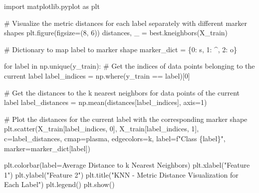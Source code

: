 \documentclass[
  letterpaper,
  DIV=11,
  numbers=noendperiod]{scrreprt}
\newenvironment{Shaded}{\begin{snugshade}}{\end{snugshade}}
\newcommand{\CommentTok}[1]{\textcolor[rgb]{0.37,0.37,0.37}{#1}}
\newcommand{\ControlFlowTok}[1]{\textcolor[rgb]{0.00,0.23,0.31}{#1}}
\newcommand{\DecValTok}[1]{\textcolor[rgb]{0.68,0.00,0.00}{#1}}
\newcommand{\ImportTok}[1]{\textcolor[rgb]{0.00,0.46,0.62}{#1}}
\newcommand{\KeywordTok}[1]{\textcolor[rgb]{0.00,0.23,0.31}{#1}}
\newcommand{\NormalTok}[1]{\textcolor[rgb]{0.00,0.23,0.31}{#1}}
\newcommand{\OperatorTok}[1]{\textcolor[rgb]{0.37,0.37,0.37}{#1}}
\newcommand{\SpecialCharTok}[1]{\textcolor[rgb]{0.37,0.37,0.37}{#1}}
\newcommand{\SpecialStringTok}[1]{\textcolor[rgb]{0.13,0.47,0.30}{#1}}
\newcommand{\StringTok}[1]{\textcolor[rgb]{0.13,0.47,0.30}{#1}}
\begin{document}
\begin{Shaded}
\begin{Highlighting}[]
\ImportTok{import}\NormalTok{ matplotlib.pyplot }\ImportTok{as}\NormalTok{ plt}

\CommentTok{\# Visualize the metric distances for each label separately with different marker shapes}
\NormalTok{plt.figure(figsize}\OperatorTok{=}\NormalTok{(}\DecValTok{8}\NormalTok{, }\DecValTok{6}\NormalTok{))}
\NormalTok{distances, \_ }\OperatorTok{=}\NormalTok{ best.kneighbors(X\_train)}

\CommentTok{\# Dictionary to map label to marker shape}
\NormalTok{marker\_dict }\OperatorTok{=}\NormalTok{ \{}\DecValTok{0}\NormalTok{: }\StringTok{\textquotesingle{}s\textquotesingle{}}\NormalTok{, }\DecValTok{1}\NormalTok{: }\StringTok{\textquotesingle{}\^{}\textquotesingle{}}\NormalTok{, }\DecValTok{2}\NormalTok{: }\StringTok{\textquotesingle{}o\textquotesingle{}}\NormalTok{\}}

\ControlFlowTok{for}\NormalTok{ label }\KeywordTok{in}\NormalTok{ np.unique(y\_train):}
    \CommentTok{\# Get the indices of data points belonging to the current label}
\NormalTok{    label\_indices }\OperatorTok{=}\NormalTok{ np.where(y\_train }\OperatorTok{==}\NormalTok{ label)[}\DecValTok{0}\NormalTok{]}
    
    \CommentTok{\# Get the distances to the k nearest neighbors for data points of the current label}
\NormalTok{    label\_distances }\OperatorTok{=}\NormalTok{ np.mean(distances[label\_indices], axis}\OperatorTok{=}\DecValTok{1}\NormalTok{)}
    
    \CommentTok{\# Plot the distances for the current label with the corresponding marker shape}
\NormalTok{    plt.scatter(X\_train[label\_indices, }\DecValTok{0}\NormalTok{], X\_train[label\_indices, }\DecValTok{1}\NormalTok{], c}\OperatorTok{=}\NormalTok{label\_distances, cmap}\OperatorTok{=}\StringTok{\textquotesingle{}plasma\textquotesingle{}}\NormalTok{, edgecolors}\OperatorTok{=}\StringTok{\textquotesingle{}k\textquotesingle{}}\NormalTok{, label}\OperatorTok{=}\SpecialStringTok{f"Class }\SpecialCharTok{\{}\NormalTok{label}\SpecialCharTok{\}}\SpecialStringTok{"}\NormalTok{, marker}\OperatorTok{=}\NormalTok{marker\_dict[label])}

\NormalTok{plt.colorbar(label}\OperatorTok{=}\StringTok{\textquotesingle{}Average Distance to k Nearest Neighbors\textquotesingle{}}\NormalTok{)}
\NormalTok{plt.xlabel(}\StringTok{"Feature 1"}\NormalTok{)}
\NormalTok{plt.ylabel(}\StringTok{"Feature 2"}\NormalTok{)}
\NormalTok{plt.title(}\StringTok{"KNN {-} Metric Distance Visualization for Each Label"}\NormalTok{)}
\NormalTok{plt.legend()}
\NormalTok{plt.show()}
\end{Highlighting}
\end{Shaded}
\end{document}
